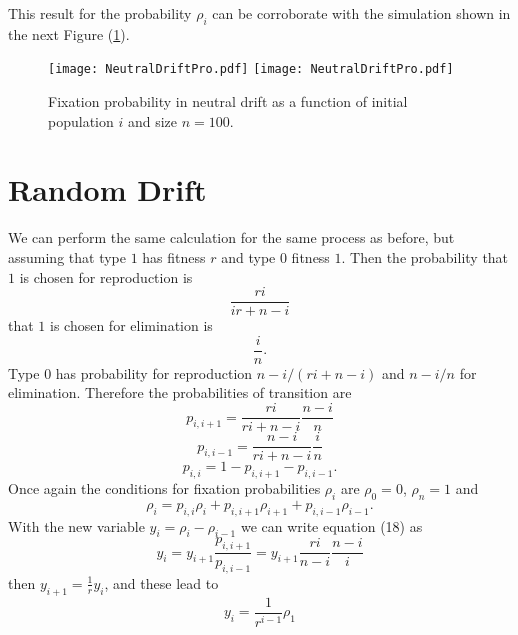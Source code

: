 This result for the probability $\rho_i$ can be corroborate  with the simulation shown in the next Figure (\ref{Fig47}).
\begin{figure}[H]
  \begin{center}
    \leavevmode
    \ifpdf
      \texttt{[image: NeutralDriftPro.pdf]}
    \else
      \texttt{[image: NeutralDriftPro.pdf]}
    \fi
    \caption{Fixation probability in neutral drift as a function of initial population $i$ and size $n=100$.}
    \label{Fig47}
  \end{center}
  \end{figure}

\section{Random Drift}
We can perform the same calculation for the same process as before, but assuming that type $1$ has fitness $r$ and type $0$ fitness $1$. Then the probability that $1$ is chosen for reproduction is
\begin{equation}
\frac{ri}{ir+n-i}
\end{equation}
that $1$ is chosen for elimination is
\begin{equation}
\frac{i}{n}.
\end{equation}
Type $0$ has probability for reproduction $n-i/(ri+n-i)$ and $n-i/n$ for elimination. Therefore the probabilities of transition are
\begin{equation}
p_{i,i+1}=\frac{ri}{ri+n-i}\frac{n-i}{n}
\end{equation}
\begin{equation}
p_{i,i-1}=\frac{n-i}{ri+n-i}\frac{i}{n}
\end{equation}
\begin{equation}
p_{i,i}=1-p_{i,i+1}-p_{i,i-1}.
\end{equation}
Once again the conditions for fixation probabilities $\rho_{i}$ are $\rho_{0}=0$, $\rho_{n}=1$ and
\begin{equation}
\rho_{i}=p_{i,i}\rho_{i}+p_{i,i+1}\rho_{i+1}+p_{i,i-1}\rho_{i-1}.
\end{equation}
 With the new variable $y_{i}=\rho_{i}-\rho_{i-1}$ we can write equation (18) as
 \begin{equation}
 y_i = y_{i+1}\frac{p_{i,i+1}}{p_{i,i-1}}=y_{i+1}\frac{ri}{n-i}\frac{n-i}{i}
 \end{equation}
 then $y_{i+1}=\frac{1}{r}y_i$, and these lead to
\begin{equation}
y_i =\frac{1}{r^{i-1}}\rho_1
\end{equation}  
